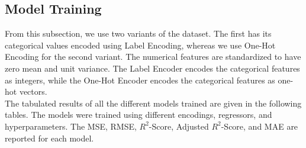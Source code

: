 \documentclass[12pt]{article}
\begin{document}
    \subsection*{Model Training}
    From this subsection, we use two variants of the dataset. The first has its categorical values encoded using Label Encoding,
    whereas we use One-Hot Encoding for the second variant. The numerical features are standardized to have zero mean and unit variance.
    The Label Encoder encodes the categorical features as integers, while the One-Hot Encoder encodes the categorical features as one-hot vectors.
    \vspace*{5pt} \\
    The tabulated results of all the different models trained are given in the following tables. The models were trained using
    different encodings, regressors, and hyperparameters. The MSE, RMSE, $R^{2}$-Score, Adjusted $R^{2}$-Score, and MAE are reported
    for each model.
\end{document}
